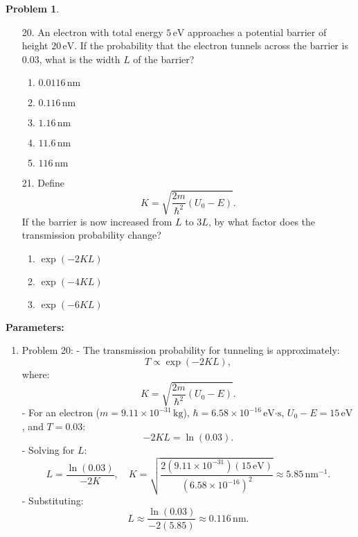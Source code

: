 \documentclass[12pt]{article}
\theoremstyle{definition} %
\newtheorem{problem}{Problem}
\theoremstyle{plain} %
\begin{document}
\begin{problem}
    \begin{enumerate}
        \item[20.] An electron with total energy \(5 \, \text{eV}\) approaches a potential barrier of height \(20 \, \text{eV}\). If the probability that the electron tunnels across the barrier is \(0.03\), what is the width \(L\) of the barrier?
        \begin{enumerate}
            \item \(0.0116 \, \text{nm}\)
            \item \textbf{\(0.116 \, \text{nm}\)}
            \item \(1.16 \, \text{nm}\)
            \item \(11.6 \, \text{nm}\)
            \item \(116 \, \text{nm}\)
        \end{enumerate}
    
        \item[21.] Define
        $$
        K = \sqrt{\frac{2m}{\hbar^2} (U_0 - E)}.
        $$
        If the barrier is now increased from \(L\) to \(3L\), by what factor does the transmission probability change?
        \begin{enumerate}
            \item \(\exp(-2KL)\)
            \item \textbf{\(\exp(-4KL)\)}
            \item \(\exp(-6KL)\)
        \end{enumerate}
    \end{enumerate}
    
    \textbf{Parameters:}
    \begin{enumerate}
        \item Problem 20:
        - The transmission probability for tunneling is approximately:
        $$
        T \propto \exp(-2KL),
        $$
        where:
        $$
        K = \sqrt{\frac{2m}{\hbar^2} (U_0 - E)}.
        $$
        - For an electron (\(m = 9.11 \times 10^{-31} \, \text{kg}\)), \(\hbar = 6.58 \times 10^{-16} \, \text{eV·s}\), \(U_0 - E = 15 \, \text{eV}\), and \(T = 0.03\):
        $$
        -2KL = \ln(0.03).
        $$
        - Solving for \(L\):
        $$
        L = \frac{\ln(0.03)}{-2K}, \quad K = \sqrt{\frac{2(9.11 \times 10^{-31})(15 \, \text{eV})}{(6.58 \times 10^{-16})^2}} \approx 5.85 \, \text{nm}^{-1}.
        $$
        - Substituting:
        $$
        L \approx \frac{\ln(0.03)}{-2(5.85)} \approx 0.116 \, \text{nm}.
        $$
    

\end{enumerate}
\end{problem}
\end{document}

